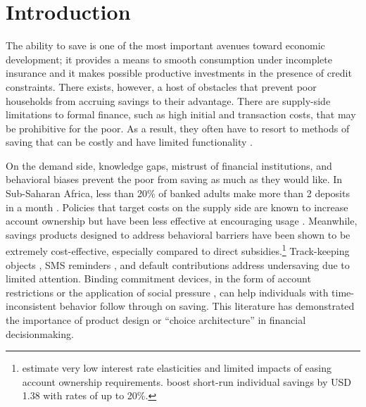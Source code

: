 \documentclass[12pt]{article}
\begin{document}
\section{Introduction}

	The ability to save is one of the most important avenues toward economic development; it provides a means to smooth consumption under incomplete insurance and it makes possible productive investments in the presence of credit constraints. There exists, however, a host of obstacles that prevent poor households from accruing savings to their advantage. There are supply-side limitations to formal finance, such as high initial and transaction costs, that may be prohibitive for the poor. As a result, they often have to resort to methods of saving that can be costly and have limited functionality \parencite{collins_portfolios_2009,karlan_savings_2014,banerjee_economic_2007,schaner_cost_2011}. 

	On the demand side, knowledge gaps, mistrust of financial institutions, and behavioral biases prevent the poor from saving as much as they would like. In Sub-Saharan Africa, less than 20\% of banked adults make more than 2 deposits in a month \parencite{demirguc-kunt_global_2015}. Policies that target costs on the supply side are known to increase account ownership but have been less effective at encouraging usage \parencite{dupas_why_2013,karlan_banking_2016}. Meanwhile, savings products designed to address behavioral barriers have been shown to be extremely cost-effective, especially compared to direct subsidies.\footnote{\textcite{karlan_price_2018} estimate very low interest rate elasticities and limited impacts of easing account ownership requirements. \textcite{schaner_persistent_2018} boost short-run individual savings by USD 1.38 with rates of up to 20\%.} Track-keeping objects \parencite{akbas_how_2016}, SMS reminders \parencite{karlan_getting_2010}, and default contributions \parencite{thaler_save_2004,chetty_active_2014,somville_saving_2018} address undersaving due to limited attention. Binding commitment devices, in the form of account restrictions \parencite{ashraf_tying_2006} or the application of social pressure \parencite{dupas_why_2013}, can help individuals with time-inconsistent behavior follow through on saving. This literature has demonstrated the importance of product design or ``choice architecture'' in financial decisionmaking.
\end{document}
